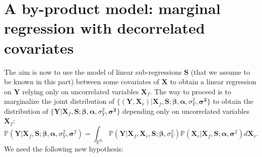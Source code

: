 \documentclass[12pt,a4paper]{report}
\begin{document}


\section{A by-product model: marginal regression with decorrelated covariates}\label{sectionmarginal}
The aim is now to use the model of linear sub-regressions $\boldsymbol{S}$ (that we assume to be known in this part) between some covariates of $\boldsymbol{X}$ to obtain a linear regression on $\boldsymbol{Y}$ relying only on uncorrelated variables $\boldsymbol{X}_f$.  The way to proceed is to marginalize the joint distribution of $\{(\boldsymbol{Y},\boldsymbol{X}_r) |\boldsymbol{X}_f,\boldsymbol{S};\boldsymbol{\beta},\boldsymbol{\alpha},\sigma_Y^2,\boldsymbol{\sigma^2}\}$ to obtain the distribution of $\{\boldsymbol{Y} |\boldsymbol{X}_f,\boldsymbol{S};\boldsymbol{\beta},\boldsymbol{\alpha},\sigma_Y^2,\boldsymbol{\sigma^2}\}$ depending only on uncorrelated variables $\boldsymbol{X}_f$:
\begin{equation}\label{eq:marginal}
\mathbb{P}(\boldsymbol{Y} |\boldsymbol{X}_f,\boldsymbol{S};\boldsymbol{\beta},\boldsymbol{\alpha},\sigma_Y^2,\boldsymbol{\sigma}^2) = \int_{{\mathbb{R}^{d_r}}}\mathbb{P}(\boldsymbol{Y}| \boldsymbol{X}_f,\boldsymbol{X}_r,\boldsymbol{S};\boldsymbol{\beta},\sigma_Y^2) \mathbb{P}(\boldsymbol{X}_r | \boldsymbol{X}_f,\boldsymbol{S};\boldsymbol{\alpha},\boldsymbol{\sigma}^2) d\boldsymbol{X}_r.
\end{equation}
We need the following new hypothesis:
\end{document}

